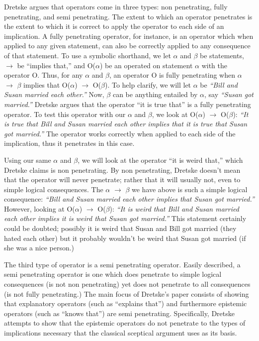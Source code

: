 \documentclass[12pt,letterpaper]{report}
\begin{document}
Dretske argues that operators come in three types: non penetrating, fully penetrating, and semi penetrating. The extent to which an operator penetrates is the extent to which it is correct to apply the operator to each side of an implication. A fully penetrating operator, for instance, is an operator which when applied to any given statement, can also be correctly applied to any consequence of that statement. To use a symbolic shorthand, we let $\alpha$ and $\beta$ be statements, $\rightarrow$ be ``implies that,'' and O($\alpha$) be an operated on statement $\alpha$ with the operator O. Thus, for any $\alpha$ and $\beta$, an operator O is fully penetrating when $\alpha$ $\rightarrow$ $\beta$ implies that O($\alpha$) $\rightarrow$ O($\beta$). To help clarify, we will let $\alpha$ be \textit{``Bill and Susan married each other.''} Now, $\beta$ can be anything entailed by $\alpha$, say \textit{``Susan got married.''} Dretske argues that the operator ``it is true that'' is a fully penetrating operator. To test this operator with our $\alpha$ and $\beta$, we look at O($\alpha$) $\rightarrow$ O($\beta$): \textit{``It is true that Bill and Susan married each other implies that it is true that Susan got married.''} The operator works correctly when applied to each side of the implication, thus it penetrates in this case.

Using our same $\alpha$ and $\beta$, we will look at the operator ``it is weird that,'' which Dretske claims is non penetrating. By non penetrating, Dretske doesn't mean that the operator will never penetrate; rather that it will usually not, even to simple logical consequences. The $\alpha$ $\rightarrow$ $\beta$ we have above is such a simple logical consequence: \textit{``Bill and Susan married each other implies that Susan got married.''} However, looking at O($\alpha$) $\rightarrow$ O($\beta$): \textit{``It is weird that Bill and Susan married each other implies it is weird that Susan got married.''} This statement certainly could be doubted; possibly it is weird that Susan and Bill got married (they hated each other) but it probably wouldn't be weird that Susan got married (if she was a nice person.)

The third type of operator is a semi penetrating operator. Easily described, a semi penetrating operator is one which does penetrate to simple logical consequences (is not non penetrating) yet does not penetrate to all consequences (is not fully penetrating.) The main focus of Dretske's paper consists of showing that explanatory  operators (such as ``explains that'') and furthermore epistemic operators (such as ``knows that'') are semi penetrating. Specifically, Dretske attempts to show that the epistemic operators do not penetrate to the types of implications necessary that the classical sceptical argument uses as its basis.
\end{document}
